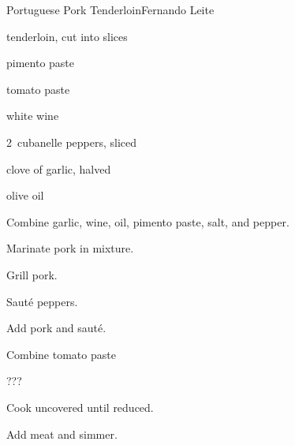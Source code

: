 \begin{recipe}{Portuguese Pork Tenderloin\FIXME}{Fernando Leite}{}

\begin{ingredients}
\item {} tenderloin, cut into slices
\item {} pimento paste
\item {} tomato paste
\item \C{\third} white wine
\item 2~cubanelle peppers, sliced
\item clove of garlic, halved
\item olive oil

\end{ingredients}

\begin{directions}
\item Combine garlic, wine, oil, pimento paste, salt, and pepper.
\item Marinate pork in mixture.
\item Grill pork.
\item Saut\'e peppers.
\item Add pork and saut\'e.
\item Combine tomato paste
\item ???
\item Cook uncovered until reduced.
\item Add meat and simmer.
\end{directions}

\end{recipe}
